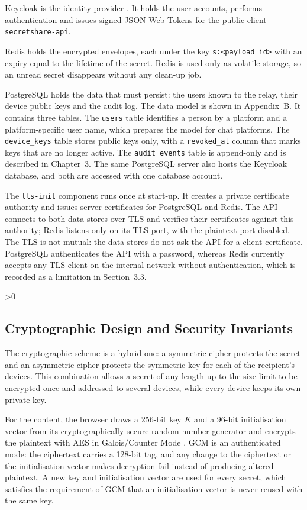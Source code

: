 \documentclass[12pt,a4paper]{article}
\numberwithin{equation}{section}
\numberwithin{figure}{section}
\numberwithin{table}{section}
\newcommand{\subsec}[1]{%
  \ifnum\value{subsection}>0\clearpage\fi
  \subsection{#1}%
}
\begin{document}
Keycloak is the identity provider \cite{keycloak}. It holds the user accounts, performs authentication and issues signed JSON Web Tokens \cite{rfc7519} for the public client \texttt{secretshare-api}.

Redis holds the encrypted envelopes, each under the key \texttt{s:<payload\_id>} with an expiry equal to the lifetime of the secret. Redis is used only as volatile storage, so an unread secret disappears without any clean-up job.

PostgreSQL holds the data that must persist: the users known to the relay, their device public keys and the audit log. The data model is shown in Appendix~B. It contains three tables. The \texttt{users} table identifies a person by a platform and a platform-specific user name, which prepares the model for chat platforms. The \texttt{device\_keys} table stores public keys only, with a \texttt{revoked\_at} column that marks keys that are no longer active. The \texttt{audit\_events} table is append-only and is described in Chapter~3. The same PostgreSQL server also hosts the Keycloak database, and both are accessed with one database account.

The \texttt{tls-init} component runs once at start-up. It creates a private certificate authority and issues server certificates for PostgreSQL and Redis. The API connects to both data stores over TLS and verifies their certificates against this authority; Redis listens only on its TLS port, with the plaintext port disabled. The TLS is not mutual: the data stores do not ask the API for a client certificate. PostgreSQL authenticates the API with a password, whereas Redis currently accepts any TLS client on the internal network without authentication, which is recorded as a limitation in Section~3.3.

\subsec{Cryptographic Design and Security Invariants}

The cryptographic scheme is a hybrid one: a symmetric cipher protects the secret and an asymmetric cipher protects the symmetric key for each of the recipient's devices. This combination allows a secret of any length up to the size limit to be encrypted once and addressed to several devices, while every device keeps its own private key.

For the content, the browser draws a 256-bit key $K$ and a 96-bit initialisation vector from its cryptographically secure random number generator and encrypts the plaintext with AES in Galois/Counter Mode \cite{nist80038d}. GCM is an authenticated mode: the ciphertext carries a 128-bit tag, and any change to the ciphertext or the initialisation vector makes decryption fail instead of producing altered plaintext. A new key and initialisation vector are used for every secret, which satisfies the requirement of GCM that an initialisation vector is never reused with the same key.
\end{document}
